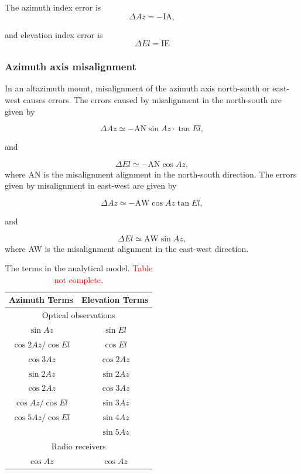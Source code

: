 The azimuth index error is 
\begin{equation}
    \Delta Az = -\text{IA},
\end{equation}

and elevation index error is
\begin{equation}\label{eq:pmodel_ie}
    \Delta El = \text{IE}
\end{equation}

\subsubsection{Azimuth axis misalignment} 

In an altazimuth mount, misalignment of the azimuth axis north-south or east-west causes errors.
The errors caused by misalignment in the north-south are given by

\begin{equation}
    \Delta Az \simeq - \text{AN} \sin{Az} \cdot \tan{El},
\end{equation}

and

\begin{equation}
    \Delta El \simeq - \text{AN} \cos{Az},
\end{equation}
where AN is the misalignment alignment in the north-south direction.
The errors given by misalignment in east-west are given by

\begin{equation}
    \Delta Az \simeq - \text{AW} \cos{Az} \tan{El},
\end{equation}

and

\begin{equation}
    \Delta El \simeq \text{AW} \sin{Az},
\end{equation}
where AW is the misalignment alignment in the east-west direction.

\begin{table}[h]
    \centering
    \caption{The terms in the analytical model. \textcolor{red}{Table not complete.} }
    \begin{tabular}{cc}
    \textbf{Azimuth Terms} & \textbf{Elevation Terms} \\
    \hline
    \multicolumn{2}{c}{Optical observations} \\ 
    \cline{1-2}
    \hline
    $\sin{Az}$ & $\sin{El}$ \\
    $\cos{2Az}/\cos{El}$ & $\cos{El}$ \\
    $\cos{3Az}$ & $\cos{2Az}$ \\
    $\sin{2Az}$ & $\sin{2Az}$ \\
    $\cos{2Az}$     & $\cos{3Az}$ \\
    $\cos{Az}/\cos{El}$ & $\sin{3Az}$ \\
    $\cos{5Az}/\cos{El}$ & $\sin{4Az}$ \\
    & $\sin{5Az}$ \\
    \multicolumn{2}{c}{Radio receivers} \\
    \cline{1-2}
    \hline
    $\cos{Az}$ & $\cos{Az}$ \\
    \end{tabular}
\end{table}

